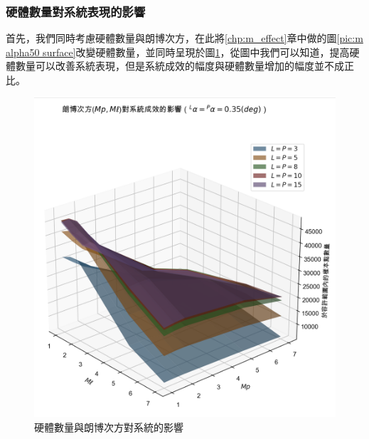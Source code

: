 


\newpage


\subsubsection{硬體數量對系統表現的影響}
\label{chp:amount_effect}

首先，我們同時考慮硬體數量與朗博次方，在此將\ref{chp:m_effect}章中做的圖\ref{pic:m alpha50 surface}改變硬體數量，並同時呈現於圖\ref{pic:m_effect}，從圖中我們可以知道，提高硬體數量可以改善系統表現，但是系統成效的幅度與硬體數量增加的幅度並不成正比。

\begin{figure}[htpb]
    \centering
    \includegraphics[width=15cm]{ch4pic/m_effect.png}
    \caption{硬體數量與朗博次方對系統的影響}
    \label{pic:m_effect}
\end{figure}

